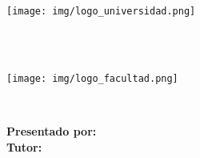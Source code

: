 \begin{titlepage}
    \begin{minipage}{2.16cm}
        \begin{center}
            \texttt{[image: img/logo\_universidad.png]}
        \end{center}
    \end{minipage}
    \hfill
    \begin{minipage}{10cm}
        \begin{center}
            \large{ \textbf{\MakeUppercase{\nombreUniversidad}} }\\
            \normalsize{ \textbf{\MakeUppercase{\nombreFacultad}} }\\
            \small{ \textbf{\MakeUppercase{\nombreCarrera}} }
        \end{center}
    \end{minipage}
    \hfill
    \begin{minipage}{2.55cm}
        \begin{center}
            \texttt{[image: img/logo\_facultad.png]}
        \end{center}
    \end{minipage}
    \vspace{5cm}\\

    \begin{center}
        \textbf{\large\MakeUppercase{\nombreProyecto}}
    \end{center}

    \vspace{4cm}
    \begin{center}
        \Large\descripcion
    \end{center}

    \vspace{2cm}
    \large\textnormal{\textbf{Presentado por:} \nombreAutor}\\
    \large\textnormal{\textbf{Tutor:} \nombreTutor}\\

    \vspace{2.5cm}
    \begin{center}
        \textbf{\MakeUppercase{\nombreCiudadPais}}\\
        \fecha
    \end{center}
\end{titlepage}
\restoregeometry